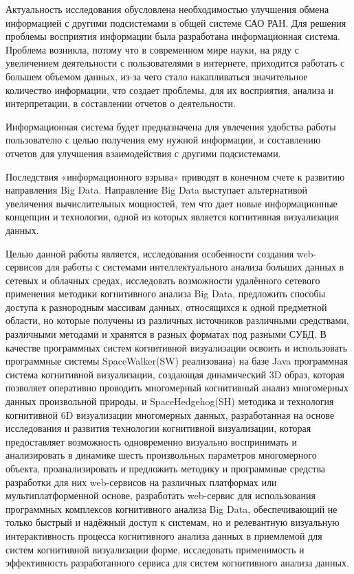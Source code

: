 Актуальность исследования обусловлена необходимостью улучшения обмена информацией с другими подсистемами в общей системе САО РАН. Для решения проблемы восприятия информации была разработана информационная система. Проблема возникла, потому что в современном мире науки, на ряду с увеличением деятельности с пользователями в интернете, приходится работать с большем объемом данных, из-за чего стало накапливаться значительное количество информации, что создает проблемы, для их восприятия, анализа и интерпретации, в составлении отчетов о деятельности. 

Информационная система будет предназначена для увлечения удобства работы пользователю с целью получения ему нужной информации, и составлению отчетов для улучшения взаимодействия с другими подсистемами.



Последствия «информационного взрыва» приводят в конечном счете к развитию направления Big Data. Направление Big Data выступает альтернативой увеличения вычислительных мощностей, тем что дает новые информационные концепции и технологии, одной из которых является когнитивная визуализация данных.

Целью данной работы является, исследования особенности создания web-сервисов для работы с системами интеллектуального анализа больших данных в сетевых и облачных средах, исследовать возможности удалённого сетевого применения методики когнитивного анализа Big Data, предложить способы доступа к разнородным массивам данных, относящихся к одной предметной области, но которые получены из различных источников различными средствами, различными методами и хранятся в разных форматах под разными СУБД. В качестве программных систем когнитивной визуализации освоить и использовать программные системы SpaceWalker(SW) реализована\right)  на базе Java программная система когнитивной визуализации, создающая динамический 3D образ, которая позволяет оперативно проводить многомерный когнитивный анализ многомерных данных произвольной природы, и SpaceHedgehog(SH) методика и технология когнитивной 6D визуализации многомерных данных, разработанная на основе исследования и развития технологии когнитивной визуализации, которая предоставляет возможность одновременно визуально воспринимать и анализировать в динамике шесть произвольных параметров многомерного объекта, проанализировать и предложить методику и программные средства разработки для них web-сервисов на различных платформах или мультиплатформенной основе, разработать web-сервис для использования программных комплексов когнитивного анализа Big Data, обеспечивающий не только быстрый и надёжный доступ к системам, но и релевантную визуальную интерактивность процесса когнитивного анализа данных в приемлемой для систем когнитивной визуализации форме, исследовать применимость и эффективность разработанного сервиса для систем когнитивного анализа данных.

